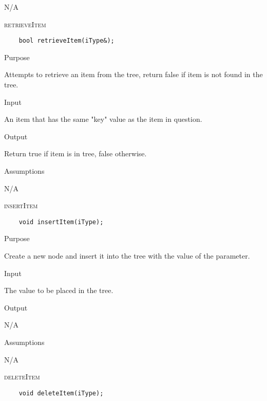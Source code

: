 \documentclass[pdftex, 12pt]{article}
\begin{document}
\begin{description}
\begin{description}
				N/A

		\end{description}
	\item{\textsc{retrieveItem}}
\begin{lstlisting}
	bool retrieveItem(iType&);
\end{lstlisting}
		\begin{description}

			\item{Purpose}

				Attempts to retrieve an item from the tree, return false if item is not found in the tree.

			\item{Input}

				An item that has the same "key" value as the item in question.

			\item{Output}

				Return true if item is in tree, false otherwise.

			\item{Assumptions}

				N/A

		\end{description}
	\item{\textsc{insertItem}}
\begin{lstlisting}
	void insertItem(iType);
\end{lstlisting}
		\begin{description}

			\item{Purpose}

				Create a new node and insert it into the tree with the value of the parameter.

			\item{Input}

				The value to be placed in the tree.

			\item{Output}

				N/A

			\item{Assumptions}

				N/A

		\end{description}
	\item{\textsc{deleteItem}}
\begin{lstlisting}
	void deleteItem(iType);
\end{lstlisting}
		\begin{description}


\end{description}
\end{description}
\end{document}
